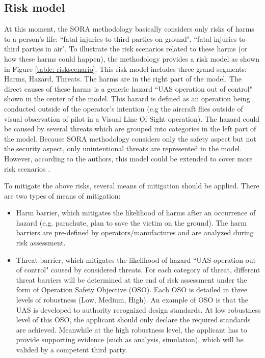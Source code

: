 \documentclass[a4paper, 10, conference]{ieeeconf}  %
\begin{document}
\subsection{Risk model}

 At this moment, the SORA methodology basically considers only risks of harms to a person's life: ``fatal injuries to third parties on ground", ``fatal injuries to third parties in air". To illustrate the risk scenarios related to these harms (or how these harms could happen), the methodology provides a risk model as shown in Figure \ref{table: riskscenario}. This risk model includes three grand segments: Harms, Hazard, Threats. The harms are in the right part of the model. The direct causes of these harms is a generic hazard ``UAS operation out of control" shown in the center of the model. This hazard is defined as an operation being conducted outside of the operator’s intention (e.g the aircraft flies outside of visual observation of pilot in a Visual Line Of Sight operation). The hazard could be caused by several threats which are grouped into categories in the left part of the model. Because SORA methodology considers only the safety aspect but not the security aspect, only unintentional threats are represented in the model. However, according to the authors, this model could be extended to cover more risk scenarios \cite{SORAV1}.
 
 To mitigate the above risks, several means of mitigation should be applied. There are two types of means of mitigation: 
\begin{itemize}
	\item Harm barrier, which mitigates the likelihood of harms after an occurrence of hazard (e.g. parachute, plan to save the victim on the ground). The harm barriers are pre-defined by operators/manufactures and are analyzed during risk assessment. 
	\item Threat barrier, which mitigates the likelihood of hazard ``UAS operation out of control" caused by considered threats. For each category of threat, different threat barriers will be determined at the end of risk assessment under the form of Operation Safety Objective (OSO). Each OSO is detailed in three levels of robustness (Low, Medium, High). An example of OSO is that the UAS is developed to authority recognized design standards. At low robustness level  of this OSO, the applicant should only declare the required standards are achieved. Meanwhile at the high robustness level, the applicant has to provide supporting evidence (such as analysis, simulation), which will be valided by a competent third party.  
\end{itemize}
\end{document}

